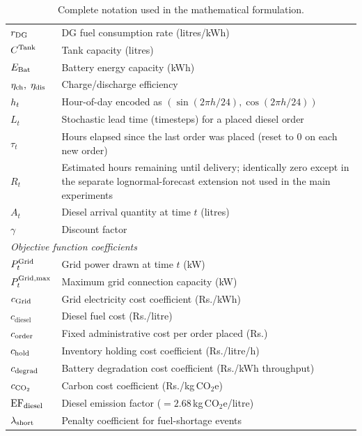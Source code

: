 \begin{table}[ht]
\begin{tabular}{l>{\raggedright\arraybackslash}p{9.8cm}}
$r_{\DG}$                              & DG fuel consumption rate (litres/kWh) \\
$C^{\Tank}$                            & Tank capacity (litres) \\
$E_{\Bat}$                             & Battery energy capacity (kWh) \\
$\eta_{\ch},\; \eta_{\dis}$            & Charge/discharge efficiency \\
$\hour_t$                              & Hour-of-day encoded as $(\sin(2\pi h/24),\cos(2\pi h/24))$ \\
$L_t$                                  & Stochastic lead time (timesteps) for a placed diesel order \\
$\tau_t$                               & Hours elapsed since the last order was placed (reset to 0 on each new order) \\
$R_t$                                  & Estimated hours remaining until delivery; identically zero except in the
                                         separate lognormal-forecast extension not used in the main experiments \\
$A_t$                                  & Diesel arrival quantity at time $t$ (litres) \\
$\gamma$                               & Discount factor \\
\midrule
\multicolumn{2}{l}{\textit{Objective function coefficients}} \\
\midrule
$P_t^{\Grid}$                          & Grid power drawn at time $t$ (kW) \\
$P_t^{\Grid,\max}$                     & Maximum grid connection capacity (kW) \\
$c_{\Grid}$                            & Grid electricity cost coefficient (Rs./kWh) \\
$c_{\mathrm{diesel}}$                  & Diesel fuel cost (Rs./litre) \\
$c_{\order}$                           & Fixed administrative cost per order placed (Rs.) \\
$c_{\hold}$                            & Inventory holding cost coefficient (Rs./litre/h) \\
$c_{\degrad}$                          & Battery degradation cost coefficient (Rs./kWh throughput) \\
$c_{\COtwo}$                           & Carbon cost coefficient (Rs./kg\,CO$_2$e) \\
$\EF_{\mathrm{diesel}}$                & Diesel emission factor ($= 2.68$\,kg\,CO$_2$e/litre) \\
$\lambda_{\short}$                     & Penalty coefficient for fuel-shortage events \\
\bottomrule
\end{tabular}
\caption{Complete notation used in the mathematical formulation.}
\label{tab:notation}
\end{table}

